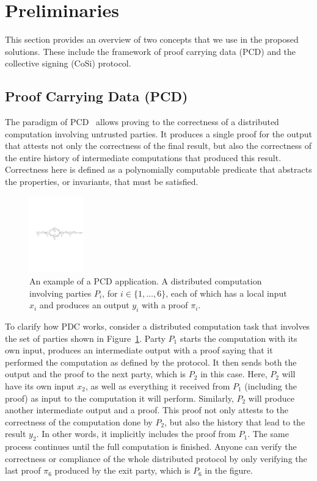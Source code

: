 \section{Preliminaries}
\label{prelim}
This section provides an overview of two concepts that we use in the 
proposed solutions. These include the framework of proof carrying data (PCD) 
and the collective signing (CoSi) protocol.


\subsection{Proof Carrying Data (PCD)}
The paradigm of PCD~\cite{chiesa2010proof} allows proving to the correctness of a distributed 
computation involving untrusted parties. It produces a single proof for the output 
that attests not only the correctness of the final result, but also 
the correctness of the entire history of intermediate computations that produced 
this result. Correctness here is defined as a polynomially computable predicate that 
abstracts the properties, or invariants, that must be satisfied.


\begin{figure}[h!]
\centerline{
\includegraphics[height= 1.3in, width = 1.0\columnwidth]{figures/pcd-diagram.pdf}}
\caption{An example of a PCD application. A distributed computation involving parties $P_i$, for 
$i \in \{1, \dots, 6\}$, each 
of which has a local input $x_i$ and produces an output $y_i$ with a proof $\pi_i$. }
\label{pcd-diagram}
\end{figure}


To clarify how PDC works, consider a distributed computation task that involves 
the set of parties shown in Figure~\ref{pcd-diagram}. Party $P_1$ starts the computation with its 
own input, produces an intermediate output with a proof saying that it performed 
the computation as defined by the protocol. It then sends both the output and the proof 
to the next party, which is $P_2$ in this case. Here, $P_2$ will 
have its own input $x_2$, as well as everything it received from $P_1$ (including the proof) 
as input to the computation it will perform. Similarly, $P_2$ will produce another 
intermediate output and a proof. This proof not only attests to the correctness of the 
computation done by $P_2$, but also the history that lead to the result $y_2$. In other 
words, it implicitly includes 
the proof from $P_1$. The same process continues until the full computation is finished. 
Anyone can verify the correctness or compliance of the whole distributed protocol by 
only verifying the last proof $\pi_6$ produced by the exit party, which is $P_6$ in the figure.


